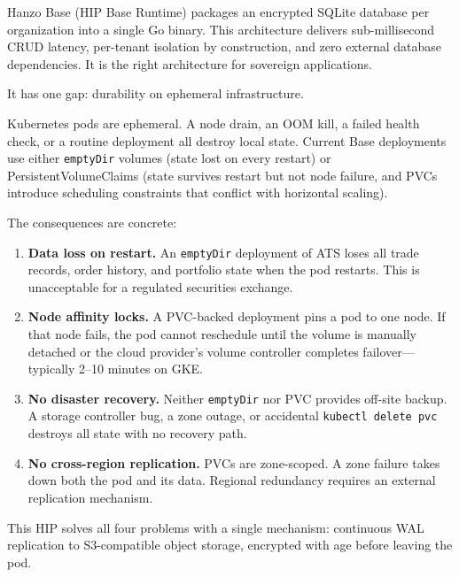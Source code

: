 \documentclass[11pt]{article}
\begin{document}
Hanzo Base (HIP Base Runtime) packages an encrypted SQLite database per
organization into a single Go binary. This architecture delivers
sub-millisecond CRUD latency, per-tenant isolation by construction, and zero
external database dependencies. It is the right architecture for sovereign
applications.

It has one gap: durability on ephemeral infrastructure.

Kubernetes pods are ephemeral. A node drain, an OOM kill, a failed health
check, or a routine deployment all destroy local state. Current Base
deployments use either \texttt{emptyDir} volumes (state lost on every
restart) or PersistentVolumeClaims (state survives restart but not node
failure, and PVCs introduce scheduling constraints that conflict with
horizontal scaling).

The consequences are concrete:

\begin{enumerate}[nosep]
    \item \textbf{Data loss on restart.} An \texttt{emptyDir} deployment of
    ATS loses all trade records, order history, and portfolio state when the
    pod restarts. This is unacceptable for a regulated securities exchange.

    \item \textbf{Node affinity locks.} A PVC-backed deployment pins a pod to
    one node. If that node fails, the pod cannot reschedule until the volume
    is manually detached or the cloud provider's volume controller completes
    failover---typically 2--10 minutes on GKE.

    \item \textbf{No disaster recovery.} Neither \texttt{emptyDir} nor PVC
    provides off-site backup. A storage controller bug, a zone outage, or
    accidental \texttt{kubectl delete pvc} destroys all state with no
    recovery path.

    \item \textbf{No cross-region replication.} PVCs are zone-scoped. A zone
    failure takes down both the pod and its data. Regional redundancy requires
    an external replication mechanism.
\end{enumerate}

This HIP solves all four problems with a single mechanism: continuous WAL
replication to S3-compatible object storage, encrypted with age before
leaving the pod.

\end{document}
